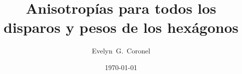 



\title{Anisotropías para todos los disparos y pesos de los hexágonos}
\author{Evelyn~G.~Coronel}


\date[]{\lowercase{\today}} %


\maketitle





